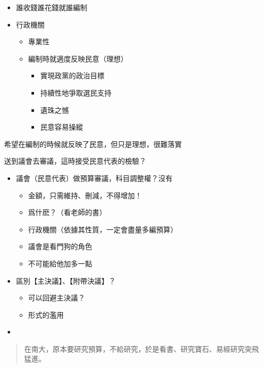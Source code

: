 \documentclass[
]{book}
\providecommand{\tightlist}{%
  \setlength{\itemsep}{0pt}\setlength{\parskip}{0pt}}
\begin{document}
\begin{itemize}
\tightlist
\item
  誰收錢誰花錢就誰編制
\item
  行政機關

  \begin{itemize}
  \tightlist
  \item
    專業性
  \item
    編制時就適度反映民意（理想）

    \begin{itemize}
    \tightlist
    \item
      實現政黨的政治目標
    \item
      持續性地爭取選民支持
    \item
      遺珠之憾
    \item
      民意容易操縱
    \end{itemize}
  \end{itemize}
\end{itemize}

希望在編制的時候就反映了民意，但只是理想，很難落實

送到議會去審議，這時接受民意代表的檢驗？

\begin{itemize}
\tightlist
\item
  議會（民意代表）做預算審議，科目調整權？沒有

  \begin{itemize}
  \tightlist
  \item
    金額，只需維持、刪減，不得增加！
  \item
    爲什麽？（看老師的書）
  \item
    行政機關（依據其性質，一定會盡量多編預算）
  \item
    議會是看門狗的角色
  \item
    不可能給他加多一點
  \end{itemize}
\item
  區別【主決議】、【附帶決議】？

  \begin{itemize}
  \tightlist
  \item
    可以回避主決議？
  \item
    形式的濫用
  \end{itemize}
\item
\end{itemize}

\begin{quote}
在南大，原本要研究預算，不給研究，於是看書、研究寶石、易經研究突飛猛進。
\end{quote}
\end{document}
